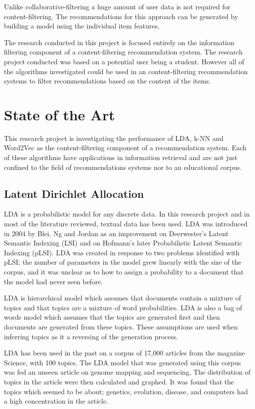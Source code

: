 Unlike collaborative-filtering a huge amount of user data is not required for content-filtering.
The recommendations for this approach can be generated by building a model using the individual item features.

The research conducted in this project is focused entirely on the information filtering component of a content-filtering recommendation system.
The research project conducted was based on a potential user being a student.
However all of the algorithms investigated could be used in an content-filtering recommendation systems to filter recommendations based on the content of the items.

\section{State of the Art}
This research project is investigating the performance of LDA, k-NN and Word2Vec as the content-filtering component of a recommendation system.
Each of these algorithms have applications in information retrieval and are not just confined to the field of recommendations systems nor to an educational corpus.

\subsection{Latent Dirichlet Allocation}
LDA is a probabilistic model for any discrete data. In this research project and in most of the literature reviewed, textual data has been used.
LDA was introduced in 2004 by Blei, Ng and Jordan as an improvement on Deerwester's Latent Semantic Indexing (LSI) and on Hofmann's later Probabilistic Latent Semantic Indexing (pLSI).
LDA was created in response to two problems identified with pLSI; the number of parameters in the model grew linearly with the size of the corpus, and it was unclear as to how to assign a probability to a document that the model had never seen before\cite{LDAintro}.

LDA is hierarchical model which assumes that documents contain a mixture of topics and that topics are a mixture of word probabilities.
LDA is also a bag of words model which assumes that the topics are generated first and then documents are generated from these topics.
These assumptions are used when inferring topics as it a reversing of the generation process\cite{LDAintro}.

LDA has been used in the past on a corpus of 17,000 articles from the magazine Science, with 100 topics.
The LDA model that was generated using this corpus was fed an unseen article on genome mapping and sequencing.
The distribution of topics in the article were then calculated and graphed.
It was found that the topics which seemed to be about; genetics, evolution, disease, and computers had a high concentration in the article\cite{ACMTopicModel}.

